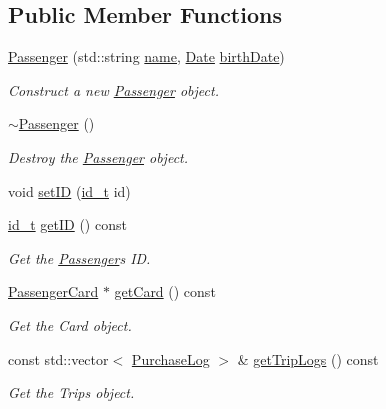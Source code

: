 \subsection*{Public Member Functions}
\begin{DoxyCompactItemize}
\item 
\mbox{\hyperlink{classPassenger_ac66212e8c1e35bb4423c6e1624ae31d9}{Passenger}} (std\+::string \mbox{\hyperlink{classPerson_a7594663aadc0de77616506df8a2f4128}{name}}, \mbox{\hyperlink{classDate}{Date}} \mbox{\hyperlink{classPerson_a7a764b56b815321eeb8412c1dcc4cabf}{birth\+Date}})
\begin{DoxyCompactList}\small\item\em Construct a new \mbox{\hyperlink{classPassenger}{Passenger}} object. \end{DoxyCompactList}\item 
\mbox{\hyperlink{classPassenger_a6a6747cafd45d2c85db2ec4e873be3c7}{$\sim$\+Passenger}} ()
\begin{DoxyCompactList}\small\item\em Destroy the \mbox{\hyperlink{classPassenger}{Passenger}} object. \end{DoxyCompactList}\item 
void \mbox{\hyperlink{classPassenger_a13b831d7ccd52a81ee4f5d47bcd2c795}{set\+ID}} (\mbox{\hyperlink{project__utils_8h_a8f3a969054ad2200720b96e7e23dd4e1}{id\+\_\+t}} id)
\item 
\mbox{\hyperlink{project__utils_8h_a8f3a969054ad2200720b96e7e23dd4e1}{id\+\_\+t}} \mbox{\hyperlink{classPassenger_ae6fcc19037be144f654c623c5b78ae24}{get\+ID}} () const
\begin{DoxyCompactList}\small\item\em Get the \mbox{\hyperlink{classPassenger}{Passenger}}\textquotesingle{}s ID. \end{DoxyCompactList}\item 
\mbox{\hyperlink{classPassengerCard}{Passenger\+Card}} $\ast$ \mbox{\hyperlink{classPassenger_ae8d5310db80438702dec5f4d649289f1}{get\+Card}} () const
\begin{DoxyCompactList}\small\item\em Get the Card object. \end{DoxyCompactList}\item 
const std\+::vector$<$ \mbox{\hyperlink{classPurchaseLog}{Purchase\+Log}} $>$ \& \mbox{\hyperlink{classPassenger_a4d8911ca0e8fe1d9226594674bd04af4}{get\+Trip\+Logs}} () const
\begin{DoxyCompactList}\small\item\em Get the Trips object. \end{DoxyCompactList}\item 

\end{DoxyCompactItemize}
